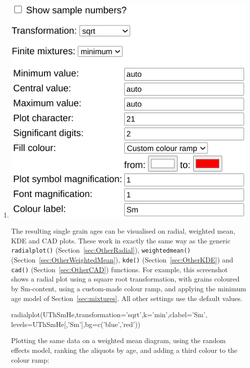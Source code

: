 \begin{refsection}
\begin{enumerate}
\item\noindent\begin{minipage}[t]{.5\linewidth}
\strut\vspace*{-\baselineskip}\newline
\includegraphics[width=\linewidth]{../figures/UThHeRadial.png}
\end{minipage}
\begin{minipage}[t]{.5\linewidth}
The resulting single grain ages can be visualised on radial, weighted
mean, KDE and CAD plots. These work in exactly the same way as the
generic \texttt{radialplot()} (Section~\ref{sec:OtherRadial}),
\texttt{weightedmean()} (Section~\ref{sec:OtherWeightedMean}),
\texttt{kde()} (Section~\ref{sec:OtherKDE}) and \texttt{cad()}
(Section~\ref{sec:OtherCAD}) functions. For example, this screenshot
shows a radial plot using a square root transformation, with grains
coloured by Sm-content, using a custom-made colour ramp, and applying
the minimum age model of Section~\ref{sec:mixtures}. All other
settings use the default values.
\end{minipage}

\begin{script}
radialplot(UThSmHe,transformation='sqrt',k='min',clabel='Sm',
           levels=UThSmHe[,'Sm'],bg=c('blue','red'))
\end{script}

Plotting the same data on a weighted mean diagram, using the random
effects model, ranking the aliquots by age, and adding a third colour
to the colour ramp:


\end{enumerate}
\end{refsection}
